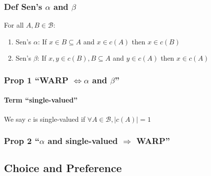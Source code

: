 \documentclass[
]{article}
\providecommand{\tightlist}{%
  \setlength{\itemsep}{0pt}\setlength{\parskip}{0pt}}
\begin{document}
\hypertarget{def-sens-alpha-and-beta}{%
\subsubsection{\texorpdfstring{Def Sen's \(\alpha\) and
\(\beta\)}{Def Sen's \textbackslash alpha and \textbackslash beta}}\label{def-sens-alpha-and-beta}}

For all \(A, B \in \mathcal{B}\):

\begin{enumerate}
\def\labelenumi{\arabic{enumi}.}
\tightlist
\item
  Sen's \(\alpha\): If \(x \in B \subseteq A\) and \(x \in c(A)\) then
  \(x\in c(B)\)
\item
  Sen's \(\beta\): If \(x,y \in c(B), B \subseteq A\) and \(y \in c(A)\)
  then \(x\in c(A)\)
\end{enumerate}

\hypertarget{prop-1-warp-iff-alpha-and-beta}{%
\subsubsection{\texorpdfstring{Prop 1 ``WARP \(\iff \alpha\) and
\(\beta\)''}{Prop 1 ``WARP \textbackslash iff \textbackslash alpha and \textbackslash beta''}}\label{prop-1-warp-iff-alpha-and-beta}}

\hypertarget{term-single-valued}{%
\paragraph{Term ``single-valued''}\label{term-single-valued}}

We say \(c\) is single-valued if
\(\forall A \in \mathcal{B}, |c(A)| = 1\)

\hypertarget{prop-2-alpha-and-single-valued-rightarrow-warp}{%
\subsubsection{\texorpdfstring{Prop 2 ``\(\alpha\) and single-valued
\(\Rightarrow\)
WARP''}{Prop 2 ``\textbackslash alpha and single-valued \textbackslash Rightarrow WARP''}}\label{prop-2-alpha-and-single-valued-rightarrow-warp}}

\hypertarget{choice-and-preference}{%
\subsection{Choice and Preference}\label{choice-and-preference}}
\end{document}
